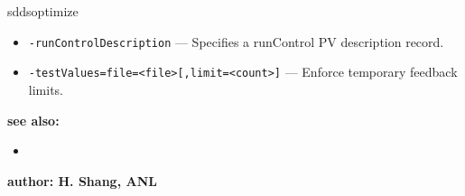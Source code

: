 \begin{sddsprog}{sddsoptimize}
\begin{itemize}
        \item {\tt -runControlDescription} --- Specifies a runControl PV description record.
        \item {\tt -testValues=file=<file>[,limit=<count>]} --- Enforce temporary feedback limits.
  \end{itemize}
\item {\bf see also:}
    \begin{itemize}
%
%
    \item {}
    \end{itemize}
%
%
\item {\bf author: H. Shang, ANL}
\end{sddsprog}
